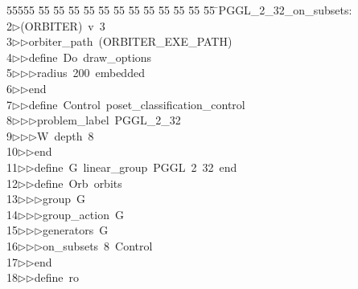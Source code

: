 %
%
\begin{tabbing}
55555 \= 55 \= 55 \= 55 \= 55 \= 55 \= 55 \= 55 \= 55 \= 55 \= 55 \= 55 \= 55 \= \>PGGL\_2\_32\_on\_subsets:\\[0pt]
2\>$\triangleright$\>(ORBITER)\ v\ 3\ \\[0pt]
3\>$\triangleright$\>$\triangleright$\>orbiter\_path\ (ORBITER\_EXE\_PATH)\ \\[0pt]
4\>$\triangleright$\>$\triangleright$\>define\ Do\ draw\_options\ \\[0pt]
5\>$\triangleright$\>$\triangleright$\>$\triangleright$\>radius\ 200\ embedded\ \\[0pt]
6\>$\triangleright$\>$\triangleright$\>end\ \\[0pt]
7\>$\triangleright$\>$\triangleright$\>define\ Control\ poset\_classification\_control\ \\[0pt]
8\>$\triangleright$\>$\triangleright$\>$\triangleright$\>problem\_label\ PGGL\_2\_32\ \\[0pt]
9\>$\triangleright$\>$\triangleright$\>$\triangleright$\>W\ depth\ 8\ \\[0pt]
10\>$\triangleright$\>$\triangleright$\>end\ \\[0pt]
11\>$\triangleright$\>$\triangleright$\>define\ G\ linear\_group\ PGGL\ 2\ 32\ end\ \\[0pt]
12\>$\triangleright$\>$\triangleright$\>define\ Orb\ orbits\ \\[0pt]
13\>$\triangleright$\>$\triangleright$\>$\triangleright$\>group\ G\ \\[0pt]
14\>$\triangleright$\>$\triangleright$\>$\triangleright$\>group\_action\ G\ \\[0pt]
15\>$\triangleright$\>$\triangleright$\>$\triangleright$\>generators\ G\ \\[0pt]
16\>$\triangleright$\>$\triangleright$\>$\triangleright$\>on\_subsets\ 8\ Control\ \\[0pt]
17\>$\triangleright$\>$\triangleright$\>end\ \\[0pt]
18\>$\triangleright$\>$\triangleright$\>define\ ro\ \\[0pt]

\end{tabbing}
